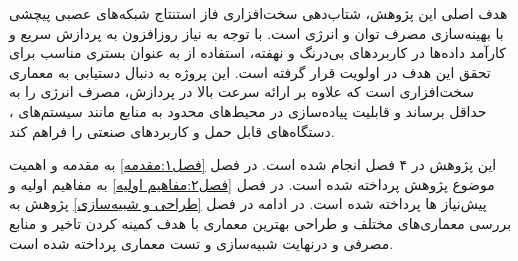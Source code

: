 هدف اصلی این پژوهش، شتاب‌دهی سخت‌افزاری فاز استنتاج شبکه‌های عصبی پیچشی با بهینه‌سازی مصرف توان و انرژی است. با توجه به نیاز روزافزون به پردازش سریع و کارآمد داده‌ها در کاربردهای بی‌درنگ و نهفته، استفاده از  به عنوان بستری مناسب برای تحقق این هدف در اولویت قرار گرفته است. این پروژه به دنبال دستیابی به معماری سخت‌افزاری است که علاوه بر ارائه سرعت بالا در پردازش، مصرف انرژی را به حداقل برساند و قابلیت پیاده‌سازی در محیط‌های محدود به منابع مانند سیستم‌های ، دستگاه‌های قابل حمل و کاربردهای صنعتی را فراهم کند.

	
این پژوهش در ۴ فصل انجام شده است. در فصل \ref{فصل۱:مقدمه} به مقدمه و اهمیت موضوع پژوهش پرداخته شده است. در فصل \ref{فصل۲:مفاهیم اولیه} به مفاهیم اولیه و پیش‌نیاز ها پرداخته شده است. در ادامه در فصل \ref{طراحی و شبیه‌سازی} پژوهش به بررسی معماری‌های مختلف و طراحی بهترین معماری با هدف کمینه کردن تاخیر و منابع مصرفی و درنهایت شبیه‌سازی و تست معماری پرداخته شده است.